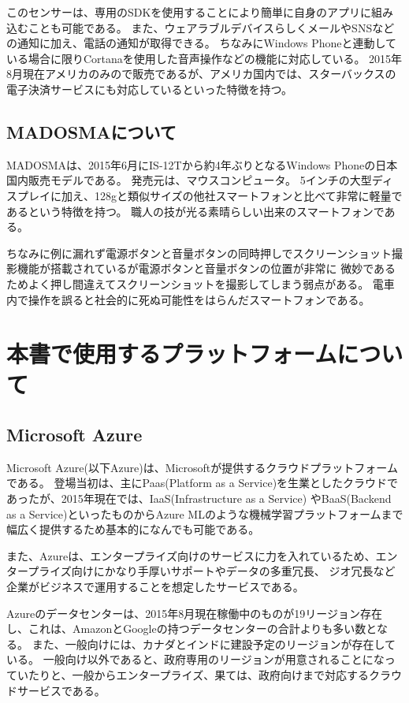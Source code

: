 \documentclass[10pt,a4j,twocolumn]{jarticle}
\begin{document}
	このセンサーは、専用のSDKを使用することにより簡単に自身のアプリに組み込むことも可能である。
	また、ウェアラブルデバイスらしくメールやSNSなどの通知に加え、電話の通知が取得できる。
	ちなみにWindows Phoneと連動している場合に限りCortanaを使用した音声操作などの機能に対応している。
	2015年8月現在アメリカのみので販売であるが、アメリカ国内では、スターバックスの電子決済サービスにも対応しているといった特徴を持つ。

	\subsection{MADOSMAについて}
	MADOSMAは、2015年6月にIS-12Tから約4年ぶりとなるWindows Phoneの日本国内販売モデルである。
	発売元は、マウスコンピュータ。
	5インチの大型ディスプレイに加え、128gと類似サイズの他社スマートフォンと比べて非常に軽量であるという特徴を持つ。
	職人の技が光る素晴らしい出来のスマートフォンである。

	ちなみに例に漏れず電源ボタンと音量ボタンの同時押しでスクリーンショット撮影機能が搭載されているが電源ボタンと音量ボタンの位置が非常に
	微妙であるためよく押し間違えてスクリーンショットを撮影してしまう弱点がある。
	電車内で操作を誤ると社会的に死ぬ可能性をはらんだスマートフォンである。

	\section{本書で使用するプラットフォームについて}
	\subsection{Microsoft Azure}
	Microsoft Azure(以下Azure)は、Microsoftが提供するクラウドプラットフォームである。
	登場当初は、主にPaas(Platform as a Service)を生業としたクラウドであったが、2015年現在では、IaaS(Infrastructure as a Service)
	やBaaS(Backend as a Service)といったものからAzure MLのような機械学習プラットフォームまで幅広く提供するため基本的になんでも可能である。

	また、Azureは、エンタープライズ向けのサービスに力を入れているため、エンタープライズ向けにかなり手厚いサポートやデータの多重冗長、
	ジオ冗長など企業がビジネスで運用することを想定したサービスである。

	Azureのデータセンターは、2015年8月現在稼働中のものが19リージョン存在し、これは、AmazonとGoogleの持つデータセンターの合計よりも多い数となる。
	また、一般向けには、カナダとインドに建設予定のリージョンが存在している。
	一般向け以外であると、政府専用のリージョンが用意されることになっていたりと、一般からエンタープライズ、果ては、政府向けまで対応するクラウドサービスである。
\end{document}
